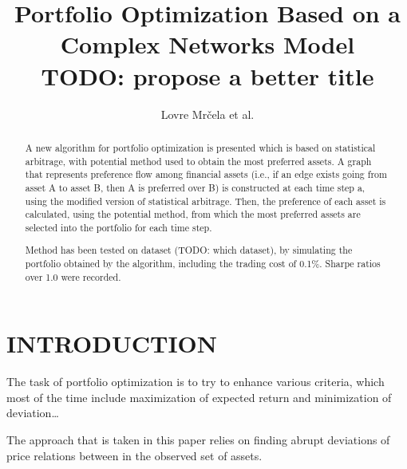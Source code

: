 \documentclass[letterpaper, 10 pt, conference]{ieeeconf}
\title{\LARGE \bf Portfolio Optimization Based on a Complex Networks Model\\
  \normalsize TODO: propose a better title}
\author{Lovre Mr\v{c}ela et al.}
\begin{document}
  \maketitle
  \thispagestyle{empty}
  \pagestyle{empty}
    
  \begin{abstract}
    
  A new algorithm for portfolio optimization is presented which is based on statistical arbitrage, with potential method used to obtain the most preferred assets.
  A graph that represents preference flow among financial assets (i.e., if an edge exists going from asset A to asset B, then A is preferred over B) is constructed at each time step a, using the modified version of statistical arbitrage.
  Then, the preference of each asset is calculated, using the potential method\cite{caklovic}, from which the most preferred assets are selected into the portfolio for each time step.
  
  Method has been tested on dataset (TODO: which dataset), by simulating the portfolio obtained by the algorithm, including the trading cost of 0.1\%.
  Sharpe ratios over 1.0 were recorded.
  
  \end{abstract}
  
  \section{INTRODUCTION}
  
  The task of portfolio optimization is to try to enhance various criteria, which most of the time include maximization of expected return and minimization of deviation\dots
  
  The approach that is taken in this paper relies on finding abrupt deviations of price relations between in the observed set of assets.
  
  
  
  
\end{document}
